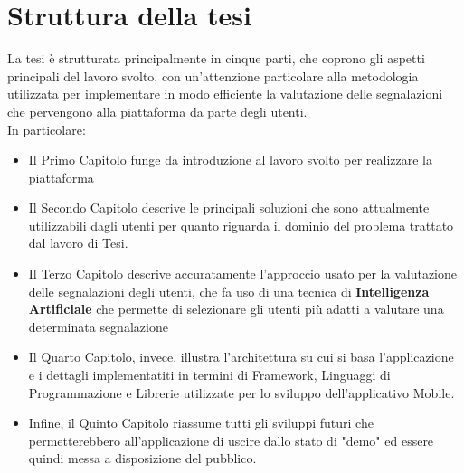 \section{Struttura della tesi}
        La tesi è strutturata principalmente in cinque parti, che coprono gli aspetti principali del lavoro svolto, con un'attenzione particolare alla metodologia utilizzata per implementare in modo efficiente la valutazione delle segnalazioni che pervengono alla piattaforma da parte degli utenti. \\
        In particolare:
        \begin{itemize}
            \item Il Primo Capitolo funge da introduzione al lavoro svolto per realizzare la piattaforma
            \item Il Secondo Capitolo descrive le principali soluzioni che sono attualmente utilizzabili dagli utenti per quanto riguarda il dominio del problema trattato dal lavoro di Tesi.
            \item Il Terzo Capitolo descrive accuratamente l'approccio usato per la valutazione delle segnalazioni degli utenti, che fa uso di una tecnica di \textbf{Intelligenza Artificiale} che permette di selezionare gli utenti più adatti a valutare una determinata segnalazione
            \item Il Quarto Capitolo, invece, illustra l'architettura su cui si basa l'applicazione e i dettagli implementatiti in termini di Framework, Linguaggi di Programmazione e Librerie utilizzate per lo sviluppo dell'applicativo Mobile.
            \item Infine, il Quinto Capitolo riassume tutti gli sviluppi futuri che permetterebbero all'applicazione di uscire dallo stato di "demo" ed essere quindi messa a disposizione del pubblico.
        \end{itemize}
